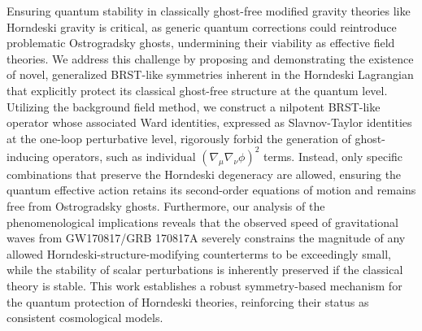 \documentclass[twocolumn]{aastex631}
\begin{document}
Ensuring quantum stability in classically ghost-free modified gravity theories like Horndeski gravity is critical, as generic quantum corrections could reintroduce problematic Ostrogradsky ghosts, undermining their viability as effective field theories. We address this challenge by proposing and demonstrating the existence of novel, generalized BRST-like symmetries inherent in the Horndeski Lagrangian that explicitly protect its classical ghost-free structure at the quantum level. Utilizing the background field method, we construct a nilpotent BRST-like operator whose associated Ward identities, expressed as Slavnov-Taylor identities at the one-loop perturbative level, rigorously forbid the generation of ghost-inducing operators, such as individual $(\nabla_\mu\nabla_\nu\phi)^2$ terms. Instead, only specific combinations that preserve the Horndeski degeneracy are allowed, ensuring the quantum effective action retains its second-order equations of motion and remains free from Ostrogradsky ghosts. Furthermore, our analysis of the phenomenological implications reveals that the observed speed of gravitational waves from GW170817/GRB 170817A severely constrains the magnitude of any allowed Horndeski-structure-modifying counterterms to be exceedingly small, while the stability of scalar perturbations is inherently preserved if the classical theory is stable. This work establishes a robust symmetry-based mechanism for the quantum protection of Horndeski theories, reinforcing their status as consistent cosmological models.
\end{document}
